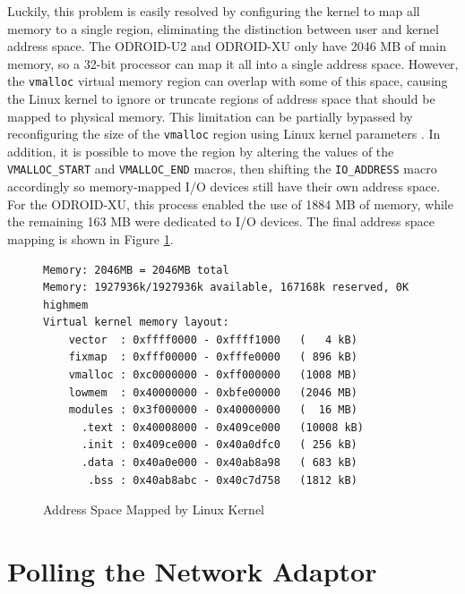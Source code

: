 \documentclass[11pt]{book}
\begin{document}
Luckily, this problem is easily resolved by configuring the kernel to map all memory to a
single region, eliminating the distinction between user and kernel address space.  The
ODROID-U2 and ODROID-XU only have 2046 MB of main memory, so a 32-bit processor can map it
all into a single address space.  However, the \verb;vmalloc; virtual memory region can
overlap with some of this space, causing the Linux kernel to ignore or truncate regions of
address space that should be mapped to physical memory.  This limitation can be partially
bypassed by reconfiguring the size of the \verb;vmalloc; region using Linux kernel
parameters \cite{vmalloc-overlap}.  In addition, it is possible to move the region by
altering the values of the \verb;VMALLOC_START; and \verb;VMALLOC_END; macros, then
shifting the \verb;IO_ADDRESS; macro accordingly so memory-mapped I/O devices still have
their own address space.  For the ODROID-XU, this process enabled the use of 1884 MB of
memory, while the remaining 163 MB were dedicated to I/O devices.  The final address space
mapping is shown in Figure \ref{addrmap}.


\begin{figure}
\begin{center}
\begin{verbatim}
Memory: 2046MB = 2046MB total
Memory: 1927936k/1927936k available, 167168k reserved, 0K highmem
Virtual kernel memory layout:
    vector  : 0xffff0000 - 0xffff1000   (   4 kB)
    fixmap  : 0xfff00000 - 0xfffe0000   ( 896 kB)
    vmalloc : 0xc0000000 - 0xff000000   (1008 MB)
    lowmem  : 0x40000000 - 0xbfe00000   (2046 MB)
    modules : 0x3f000000 - 0x40000000   (  16 MB)
      .text : 0x40008000 - 0x409ce000   (10008 kB)
      .init : 0x409ce000 - 0x40a0dfc0   ( 256 kB)
      .data : 0x40a0e000 - 0x40ab8a98   ( 683 kB)
       .bss : 0x40ab8abc - 0x40c7d758   (1812 kB)
\end{verbatim}
\end{center}
\caption{Address Space Mapped by Linux Kernel}
\label{addrmap}
\end{figure}

\section{Polling the Network Adaptor}
\end{document}
